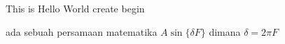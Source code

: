 \documentclass[11]{article}
\begin{document}
	This is Hello World create begin
	
	ada sebuah persamaan matematika $A\sin\{\delta F \}$ dimana $\delta = 2 \pi F$
\end{document}
